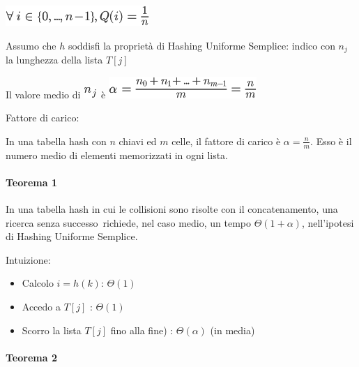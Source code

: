 \documentclass{article}
\providecommand{\tightlist}{%
  \setlength{\itemsep}{0pt}\setlength{\parskip}{0pt}}
\let\oldparagraph\paragraph
\renewcommand{\paragraph}[1]{\oldparagraph{#1}\mbox{}}
\begin{document}
{\includegraphics{images/image242.png}

{}

{Assumo che $h$ soddisfi la proprietà di Hashing Uniforme Semplice: indico con $n_j$ la lunghezza della lista $T[j]$}

{}

{Il valore medio di }\includegraphics{images/image243.png}{~è
}\includegraphics{images/image245.png}

{}

{Fattore di carico: }

{In una tabella hash con $n$ chiavi ed $m$ celle, il fattore di carico è $\alpha = \frac{n}{m}$. Esso è il numero medio di
elementi memorizzati in ogni lista.}

{}

\hypertarget{h.coagge9vpuqt}{\paragraph{\texorpdfstring{{Teorema
1}}{Teorema 1}}\label{h.coagge9vpuqt}}

{In una tabella hash in cui le collisioni sono risolte con il
concatenamento, una }{ricerca senza successo}{~richiede, nel caso medio,
un tempo $\Theta(1+\alpha)$, nell'ipotesi di
Hashing Uniforme Semplice.}

{}

{Intuizione:}

\begin{itemize}
\tightlist
\item
  {Calcolo $i=h(k)$: $\Theta(1)$}
\item
  {Accedo a $T[j]$ : $\Theta(1)$}
\item
  {Scorro la lista $T[j]$ fino alla fine) : $\Theta(\alpha)$ (in media)}
\end{itemize}

{}

\hypertarget{h.u0cyuvvucft2}{\paragraph{\texorpdfstring{{Teorema
2}}{Teorema 2}}\label{h.u0cyuvvucft2}}

}
\end{document}
